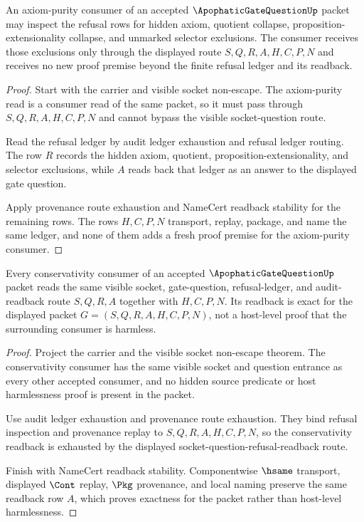 \begin{theorem}
\label{thm:apophatic-gate-question-axiom-purity-consumer-boundary}
An axiom-purity consumer of an accepted $\ApophaticGateQuestionUp$ packet may inspect the refusal rows for hidden axiom, quotient collapse, proposition-extensionality collapse, and unmarked selector exclusions. The consumer receives those exclusions only through the displayed route $S,Q,R,A,H,C,P,N$ and receives no new proof premise beyond the finite refusal ledger and its readback.
\end{theorem}
\begin{proof}
Start with the carrier and visible socket non-escape. The axiom-purity read is a consumer read of the same packet, so it must pass through $S,Q,R,A,H,C,P,N$ and cannot bypass the visible socket-question route.

Read the refusal ledger by audit ledger exhaustion and refusal ledger routing. The row $R$ records the hidden axiom, quotient, proposition-extensionality, and selector exclusions, while $A$ reads back that ledger as an answer to the displayed gate question.

Apply provenance route exhaustion and NameCert readback stability for the remaining rows. The rows $H,C,P,N$ transport, replay, package, and name the same ledger, and none of them adds a fresh proof premise for the axiom-purity consumer.
\end{proof}

\begin{theorem}
\label{thm:apophatic-gate-question-conservativity-readback-exactness}
Every conservativity consumer of an accepted $\ApophaticGateQuestionUp$ packet reads the same visible socket, gate-question, refusal-ledger, and audit-readback route $S,Q,R,A$ together with $H,C,P,N$. Its readback is exact for the displayed packet $G=(S,Q,R,A,H,C,P,N)$, not a host-level proof that the surrounding consumer is harmless.
\end{theorem}
\begin{proof}
Project the carrier and the visible socket non-escape theorem. The conservativity consumer has the same visible socket and question entrance as every other accepted consumer, and no hidden source predicate or host harmlessness proof is present in the packet.

Use audit ledger exhaustion and provenance route exhaustion. They bind refusal inspection and provenance replay to $S,Q,R,A,H,C,P,N$, so the conservativity readback is exhausted by the displayed socket-question-refusal-readback route.

Finish with NameCert readback stability. Componentwise $\hsame$ transport, displayed $\Cont$ replay, $\Pkg$ provenance, and local naming preserve the same readback row $A$, which proves exactness for the packet rather than host-level harmlessness.
\end{proof}

